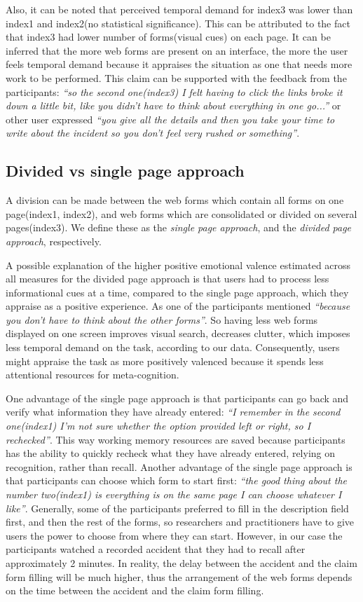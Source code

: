\documentclass[a4paper]{report}
\begin{document}
			Also, it can be noted that perceived temporal demand for index3 was lower than index1 and index2(no statistical significance). This can be attributed to the fact that index3 had lower number of forms(visual cues) on each page. It can be inferred that the more web forms are present on an interface, the more the user feels temporal demand because it appraises the situation as one that needs more work to be performed. This claim can be supported with the feedback from the participants: \textit{``so the second one(index3) I felt having to click the links broke it down a little bit, like you didn't have to think about everything in one go...''} or other user expressed \textit{``you give all the details and then you take your time to write about the incident so you don't feel very rushed or something''}. 
				
		\subsection{Divided vs single page approach}
			A division can be made between the web forms which contain all forms on one page(index1, index2), and web forms which are consolidated or divided on several pages(index3). We define these as the \textit{single page approach}, and the \textit{divided page approach}, respectively.
		
			A possible explanation of the higher positive emotional valence estimated across all measures for the divided page approach is that users had to process less informational cues at a time, compared to the single page approach, which they appraise as a positive experience. As one of the participants mentioned \textit{``because you don't have to think about the other forms''}. So having less web forms displayed on one screen improves visual search, decreases clutter, which imposes less temporal demand on the task, according to our data. Consequently, users might 
			appraise the task as more positively valenced because it spends less attentional resources for meta-cognition.
		
			One advantage of the single page approach is that participants can go back and verify what information they have already entered: \textit{``I remember in the second one(index1) I'm not sure whether the option provided left or right, so I rechecked''}. This way working memory resources are saved because participants has the ability to quickly recheck what they have already entered, relying on recognition, rather than recall\cite{nielsen1990heuristic}. Another advantage of the single page approach is that participants can choose which form to start first: \textit{``the good thing about the number two(index1) is everything is on the same page I can choose whatever I like''}. Generally, some of the participants preferred to fill in the description field first, and then the rest of the forms, so researchers and practitioners have to give users the power to choose from where they can start. However, in our case the participants watched a recorded accident that they had to recall after approximately 2 minutes. In reality, the delay between the accident and the claim form filling will be much higher, thus the arrangement of the web forms depends on the time between the accident and the claim form filling.
		
\end{document}
